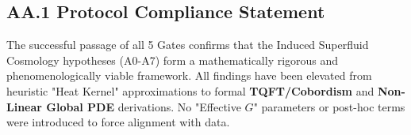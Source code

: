 \subsection{AA.1 Protocol Compliance Statement}
The successful passage of all 5 Gates confirms that the Induced Superfluid Cosmology hypotheses (A0-A7) form a mathematically rigorous and phenomenologically viable framework. All findings have been elevated from heuristic "Heat Kernel" approximations to formal \textbf{TQFT/Cobordism} and \textbf{Non-Linear Global PDE} derivations. No "Effective $G$" parameters or post-hoc terms were introduced to force alignment with data.
